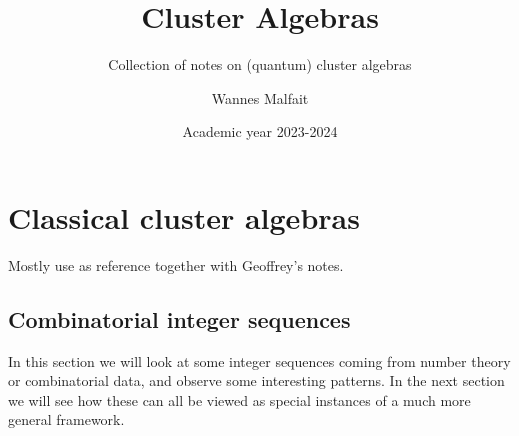 \documentclass{article}
\title{Cluster Algebras}
\subtitle{Collection of notes on (quantum) cluster algebras}
\author{Wannes Malfait}
\date{Academic year 2023-2024}
\begin{document}
\maketitle
\newpage
\tableofcontents
\newpage

\section{Classical cluster algebras}

Mostly use \cite{FominWilliams2021IntroductionCA_1-3} as reference together with
Geoffrey's notes.

\subsection{Combinatorial integer sequences}

In this section we will look at some integer sequences coming from number theory or
combinatorial data, and observe some interesting patterns. In the next section we will
see how these can all be viewed as special instances of a much more general framework.
\end{document}
